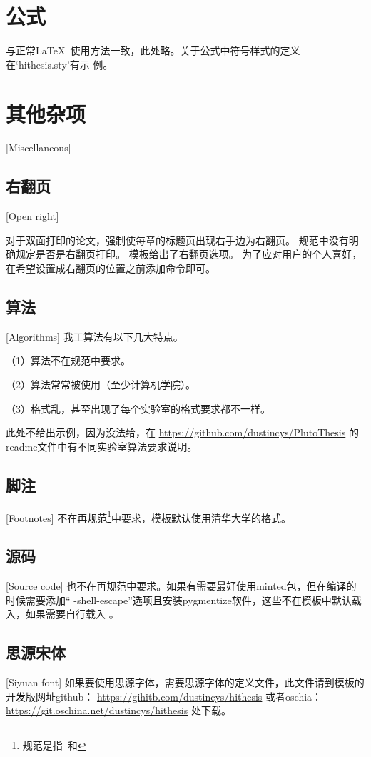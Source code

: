 \section{公式}
与正常\LaTeX\ 使用方法一致，此处略。关于公式中符号样式的定义在`hithesis.sty'有示
例。

\section{其他杂项}[Miscellaneous]

\subsection{右翻页}[Open right]

对于双面打印的论文，强制使每章的标题页出现右手边为右翻页。
规范中没有明确规定是否是右翻页打印。
模板给出了右翻页选项。
为了应对用户的个人喜好，在希望设置成右翻页的位置之前添加命令即可。

\subsection{算法}[Algorithms]
我工算法有以下几大特点。

（1）算法不在规范中要求。

（2）算法常常被使用（至少计算机学院）。

（3）格式乱，甚至出现了每个实验室的格式要求都不一样。

此处不给出示例，因为没法给，在
\href{https://github.com/dustincys/PlutoThesis}{https://github.com/dustincys/PlutoThesis}
的readme文件中有不同实验室算法要求说明。

\subsection{脚注}[Footnotes]
不在再规范\footnote{规范是指\PGR\ 和\UGR}中要求，模板默认使用清华大学的格式。

\subsection{源码}[Source code]
也不在再规范中要求。如果有需要最好使用minted包，但在编译的时候需要添加“
-shell-escape”选项且安装pygmentize软件，这些不在模板中默认载入，如果需要自行载入
。
\subsection{思源宋体}[Siyuan font]
如果要使用思源字体，需要思源字体的定义文件，此文件请到模板的开发版网址github：
\href{https://gihitb.com/dustincys/hithesis}{https://gihitb.com/dustincys/hithesis}
或者oschia：
\href{https://git.oschina.net/dustincys/hithesis}{https://git.oschina.net/dustincys/hithesis}
处下载。


